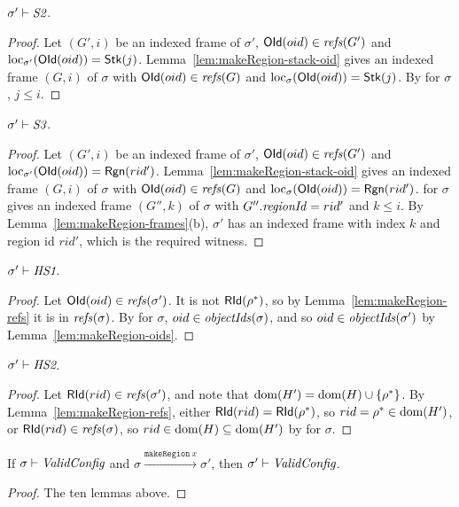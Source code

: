 \begin{lemma}[\inv{S2}] 
$\sigma' \vdash \textit{S2}$.
\end{lemma}
\begin{proof}
Let $(G', i)$ be an indexed frame of $\sigma'$, $\mathsf{OId}(oid) \in \mathit{refs}(G')$ and
$\mathrm{loc}_{\sigma'}(\mathsf{OId}(oid)) = \mathsf{Stk}(j)$. Lemma~\ref{lem:makeRegion-stack-oid} gives an indexed frame
$(G, i)$ of $\sigma$ with $\mathsf{OId}(oid) \in \mathit{refs}(G)$ and $\mathrm{loc}_{\sigma}(\mathsf{OId}(oid)) = \mathsf{Stk}(j)$. By  for
$\sigma$, $j \le i$.
\end{proof}

\begin{lemma}[\inv{S3}] 
$\sigma' \vdash \textit{S3}$.
\end{lemma}
\begin{proof}
Let $(G', i)$ be an indexed frame of $\sigma'$, $\mathsf{OId}(oid) \in \mathit{refs}(G')$ and
$\mathrm{loc}_{\sigma'}(\mathsf{OId}(oid)) = \mathsf{Rgn}(rid')$. Lemma~\ref{lem:makeRegion-stack-oid} gives an indexed frame
$(G, i)$ of $\sigma$ with $\mathsf{OId}(oid) \in \mathit{refs}(G)$ and $\mathrm{loc}_{\sigma}(\mathsf{OId}(oid)) = \mathsf{Rgn}(rid')$.  for
$\sigma$ gives an indexed frame $(G'', k)$ of $\sigma$ with $G''.\mathit{regionId} = rid'$ and $k \le i$. By
Lemma~\ref{lem:makeRegion-frames}(b), $\sigma'$ has an indexed frame with index $k$ and region id $rid'$,
which is the required witness.
\end{proof}

\begin{lemma}[\inv{HS1}] 
$\sigma' \vdash \textit{HS1}$.
\end{lemma}
\begin{proof}
Let $\mathsf{OId}(oid) \in \mathit{refs}(\sigma')$. It is not $\mathsf{RId}(\rho^*)$, so by Lemma~\ref{lem:makeRegion-refs}
it is in $\mathit{refs}(\sigma)$. By  for $\sigma$, $oid \in \mathit{objectIds}(\sigma)$, and so
$oid \in \mathit{objectIds}(\sigma')$ by Lemma~\ref{lem:makeRegion-oids}.
\end{proof}

\begin{lemma}[\inv{HS2}] 
$\sigma' \vdash \textit{HS2}$.
\end{lemma}
\begin{proof}
Let $\mathsf{RId}(rid) \in \mathit{refs}(\sigma')$, and note that $\mathrm{dom}(H') = \mathrm{dom}(H) \cup \{\rho^*\}$. By
Lemma~\ref{lem:makeRegion-refs}, either $\mathsf{RId}(rid) = \mathsf{RId}(\rho^*)$, so $rid = \rho^* \in \mathrm{dom}(H')$,
or $\mathsf{RId}(rid) \in \mathit{refs}(\sigma)$, so $rid \in \mathrm{dom}(H) \subseteq \mathrm{dom}(H')$ by  for $\sigma$.
\end{proof}

\begin{theorem} 
If $\sigma \vdash \textit{ValidConfig}$ and $\sigma \xrightarrow{\texttt{makeRegion}\ x} \sigma'$, then
$\sigma' \vdash \textit{ValidConfig}$.
\end{theorem}
\begin{proof}
The ten lemmas above.
\end{proof}
